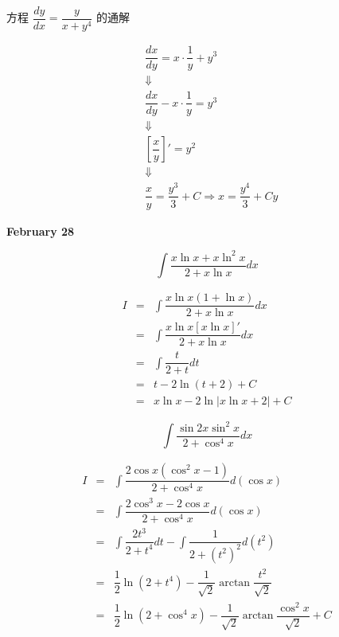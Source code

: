 \begin{example}[][Exam: 28.4.12]
	方程 $\dfrac{dy}{dx}=\dfrac{y}{x+y^{4}}$ 的通解
\end{example}
\begin{solution}
	\begin{eqnarray*}
		& \dfrac{dx}{dy} = x \cdot \dfrac{1}{y} + y^{3}\\
		& \Downarrow \\
		& \dfrac{dx}{dy} - x \cdot \dfrac{1}{y} = y^{3}\\
		& \Downarrow \\
		& \left[\dfrac{x}{y}\right]' = y^{2}\\
		& \Downarrow \\
		& \dfrac{x}{y} = \dfrac{y^{3}}{3} + C\Rightarrow x = \dfrac{y^{4}}{3} + Cy
	\end{eqnarray*}
\end{solution}

\textcolor{purplea}{\textbf{February 28}}

\begin{example}[][Exam: 28.4.13]
	$$\int\dfrac{x\ln x+x\ln^{2}x}{2+x\ln x}dx$$
\end{example}
\begin{solution}
	\begin{eqnarray*}
		I & = & \int\dfrac{x\ln x(1+\ln x)}{2+x\ln x}dx\\
		  & = & \int\dfrac{x\ln x\left[x\ln x\right]'}{2+x\ln x}dx\\
		  & = & \int\dfrac{t}{2+t}dt\\
		  & = & t - 2\ln(t+2) + C\\
		  & = & x\ln x - 2\ln\big|x\ln x + 2\big| + C
	\end{eqnarray*}
\end{solution}
\begin{example}[][Exam: 28.4.14]
	$$\int\dfrac{\sin 2x\sin^{2}x}{2+\cos^{4} x}dx$$
\end{example}
\begin{solution}
	\begin{eqnarray*}
		I & = & \int\dfrac{2\cos x(\cos^{2}x-1)}{2+\cos^{4} x}d(\cos x)\\
		  & = & \int\dfrac{2\cos^{3} x - 2\cos x}{2+\cos^{4} x}d(\cos x)\\
		  & = & \int\dfrac{2t^{3}}{2+t^{4}}dt - \int \dfrac{1}{2+(t^{2})^{2}}d(t^{2})\\
		  & = & \dfrac{1}{2}\ln(2+t^{4}) - \dfrac{1}{\sqrt{2}}\arctan \dfrac{t^{2}}{\sqrt{2}}\\
		  & = & \dfrac{1}{2}\ln(2+\cos^{4} x) - \dfrac{1}{\sqrt{2}}\arctan \dfrac{\cos^{2} x}{\sqrt{2}} + C
	\end{eqnarray*}
\end{solution}


